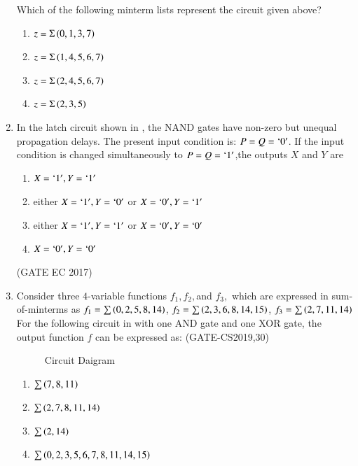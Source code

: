 \begin{enumerate}[label=\arabic*.,ref=\theenumi]
		Which of the following minterm lists represent the circuit given above?
	\begin{enumerate}
		\item $z=\Sigma\left(0,1,3,7\right)$
		\item $z=\Sigma\left(1,4,5,6,7\right)$
		\item $z=\Sigma\left(2,4,5,6,7\right)$
		\item $z=\Sigma\left(2,3,5\right)$
	\end{enumerate}	   
\item In the latch circuit shown
in
, the NAND gates have non-zero but unequal propagation delays. The present input condition is: $P=Q=\lq 0\rq$. If the input condition is changed simultaneously to $P=Q=\lq 1\rq$,the outputs $X$ and $Y$ are 
\begin{figure}[H]
\centering
\resizebox{0.75\columnwidth}{!}{%

	}
	\caption{}
\label{figure_1}
\end{figure}
\begin{enumerate}
\item $X=\lq 1\rq,Y=\lq 1 \rq$
\item either $X=\lq 1\rq,Y=\lq 0\rq$ or $X=\lq 0\rq,Y=\lq 1\rq$
\item either $X=\lq 1\rq,Y=\lq 1\rq$ or $X=\lq 0\rq,Y=\lq 0\rq$
\item $X=\lq 0\rq,Y=\lq 0 \rq$
\end{enumerate}
\hfill(GATE EC 2017)

\item Consider three $4$-variable functions $f_1, f_2, $and $f_3,$ which are expressed in sum-of-minterms as \newline \quad $f_1 = \sum\left(0,2,5,8,14\right)$, \quad $f_2=\sum\left(2,3,6,8,14,15\right)$, \quad $f_3 = \sum\left(2,7,11,14\right)$ \newline For the following circuit 
	in 
	with one AND gate and one XOR gate, the output function $f$ can be expressed as:
	\hfill(GATE-CS2019,30)
	\begin{figure}[H]
		 \centering
		 \resizebox{0.75\columnwidth}{!}{%
			
			}
                 \caption{Circuit Daigram}
	\label{fig:GATE-CS2019,30}
	\end{figure}
		\begin{enumerate}
		\item $\sum\left(7,8,11\right)$
		\item $\sum\left(2,7,8,11,14\right)$
		\item $\sum\left(2,14\right)$
		\item $\sum\left(0,2,3,5,6,7,8,11,14,15\right)$
		\end{enumerate}


\end{enumerate}
